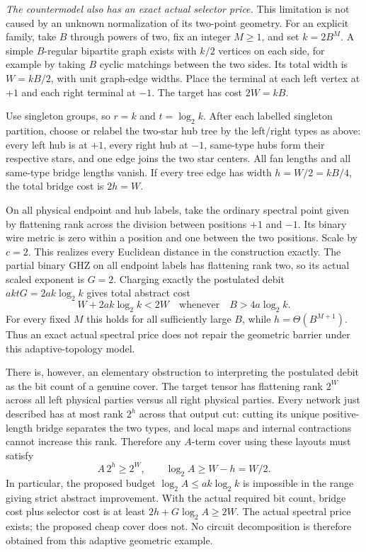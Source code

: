 \emph{The countermodel also has an exact actual selector price.}
This limitation is not caused by an unknown normalization of its
two-point geometry. For an explicit family, take $B$ through powers
of two, fix an integer $M\ge1$, and set $k=2B^M$. A simple
$B$-regular bipartite graph exists with $k/2$ vertices on each side,
for example by taking $B$ cyclic matchings between the two sides.
Its total width is $W=kB/2$, with unit graph-edge widths. Place the
terminal at each left vertex at $+1$ and each right terminal at
$-1$. The target has cost $2W=kB$.

Use singleton groups, so $r=k$ and $t=\log_2k$. After each labelled
singleton partition, choose or relabel the two-star hub tree by the
left/right types as above: every left hub is at $+1$, every right
hub at $-1$, same-type hubs form their respective stars, and one
edge joins the two star centers. All fan lengths and all same-type
bridge lengths vanish. If every tree edge has width
$h=W/2=kB/4$, the total bridge cost is $2h=W$.

On all physical endpoint and hub labels, take the ordinary spectral
point given by flattening rank across the division between positions
$+1$ and $-1$. Its binary wire metric is zero within a position and
one between the two positions. Scale by $c=2$. This realizes every
Euclidean distance in the construction exactly. The partial binary
GHZ on all endpoint labels has flattening rank two, so its actual
scaled exponent is $G=2$. Charging exactly the postulated debit
$aktG=2ak\log_2k$ gives total abstract cost
\[
                      W+2ak\log_2k<2W
             \quad\text{whenever}\quad B>4a\log_2k.
\]
For every fixed $M$ this holds for all sufficiently large $B$, while
$h=\Theta(B^{M+1})$. Thus an exact actual spectral price does not
repair the geometric barrier under this adaptive-topology model.

There is, however, an elementary obstruction to interpreting the
postulated debit as the bit count of a genuine cover. The target
tensor has flattening rank $2^W$ across all left physical parties
versus all right physical parties. Every network just described
has at most rank $2^h$ across that output cut: cutting its unique
positive-length bridge separates the two types, and local maps and
internal contractions cannot increase this rank. Therefore any
$A$-term cover using these layouts must satisfy
\[
                         A\,2^h\ge2^W,
 \qquad \log_2A\ge W-h=W/2.
\]
In particular, the proposed budget $\log_2A\le ak\log_2k$ is
impossible in the range giving strict abstract improvement. With
the actual required bit count, bridge cost plus selector cost is
at least $2h+G\log_2A\ge2W$. The actual spectral price exists;
the proposed cheap cover does not. No circuit decomposition is
therefore obtained from this adaptive geometric example.


